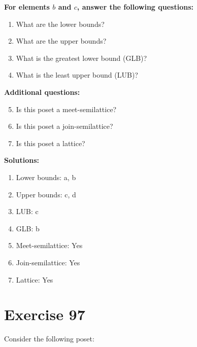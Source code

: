 \documentclass{article}
\begin{document}
    \textbf{For elements $b$ and $c$, answer the following questions:}
\begin{enumerate}
    \item What are the lower bounds?
    \item What are the upper bounds?
    \item What is the greatest lower bound (GLB)?
    \item What is the least upper bound (LUB)?
\end{enumerate}
    \hspace*{3ex} \textbf{Additional questions:}
\begin{enumerate}
    \setcounter{enumi}{4}
    \item Is this poset a meet-semilattice?
    \item Is this poset a join-semilattice?
    \item Is this poset a lattice?
\end{enumerate}

\textbf{Solutions:}
\begin{enumerate}
    \item Lower bounds: {a, b}
    \item Upper bounds: {c, d}
    \item LUB: c
    \item GLB: b
    \item Meet-semilattice: Yes
    \item Join-semilattice: Yes
    \item Lattice: Yes
\end{enumerate}
\newpage
\section*{Exercise 97}
Consider the following poset:
\begin{center}
\end{center}
\end{document}

